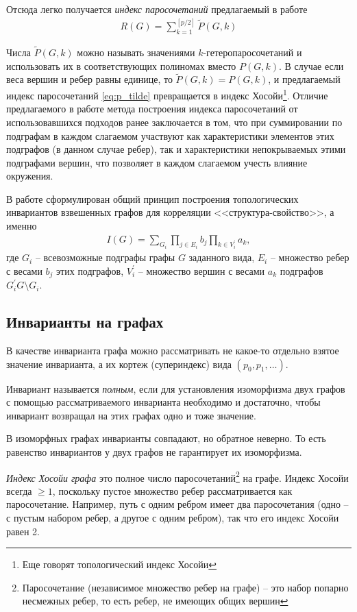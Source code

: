 \documentclass[%
	11pt,
	a4paper,
	utf8,
		]{article}
\begin{document}
Отсюда легко получается \emph{индекс паросочетаний} предлагаемый в работе \cite{kruglyak-new-invar:2015}
\begin{align*}
	R(G) = \sum_{k=1}^{[p/2]} \tilde{P}(G, k)
\end{align*}

Числа $ \tilde{P}(G, k) $ можно называть значениями $ k $-гетеропаросочетаний и использовать их в соответствующих полиномах вместо $ P(G, k) $. В случае если веса вершин и ребер равны единице, то $ \tilde{P}(G, k) = P(G, k) $, и предлагаемый индекс паросочетаний \eqref{eq:p_tilde} превращается в индекс Хосойи\footnote{Еще говорят топологический индекс Хосойи}. Отличие предлагаемого в работе \cite{kruglyak-new-invar:2015} метода построения индекса паросочетаний от использовавшихся подходов ранее заключается в том, что при суммировании по подграфам в каждом слагаемом участвуют как характеристики элементов этих подграфов (в данном случае ребер), так и характеристики непокрываемых этими подграфами вершин, что позволяет в каждом слагаемом учесть влияние окружения.

В работе \cite{kruglyak-new-invar:2015} сформулирован общий принцип построения топологических инвариантов взвешенных графов для корреляции <<структура-свойство>>, а именно
\begin{align*}
	I(G) = \sum_{G_i} \prod_{j \in E_i} b_j \prod_{k \in V^{'}_i} a_k,
\end{align*}
где $ G_i $ -- всевозможные подграфы графы $ G $ заданного вида, $ E_i $ -- множество ребер с весами $ b_j $ этих подграфов, $ V^{'}_i $ -- множество вершин с весами $ a_k $ подграфов $ G^{'}_i G \setminus G_i $.

\subsection{Инварианты на графах}

В качестве инварианта графа можно рассматривать не какое-то отдельно взятое значение инварианта, а их кортеж (супериндекс) вида $ (p_0, p_1, \ldots) $.

Инвариант называется \emph{полным}, если для установления изоморфизма двух графов с помощью рассматриваемого инварианта необходимо и достаточно, чтобы инвариант возвращал на этих графах одно и тоже значение.

В изоморфных графах инварианты совпадают, но обратное неверно. То есть равенство инвариантов у двух графов не гарантирует их изоморфизма.

\emph{Индекс Хосойи графа} это полное число паросочетаний\footnote{Паросочетание (независимое множество ребер на графе) -- это набор попарно несмежных ребер, то есть ребер, не имеющих общих вершин} на графе. Индекс Хосойи всегда $ \geqslant 1 $, поскольку пустое множество ребер рассматривается как паросочетание. Например, путь с одним ребром имеет два паросочетания (одно -- с пустым набором ребер, а другое с одним ребром), так что его индекс Хосойи равен 2.
\end{document}
